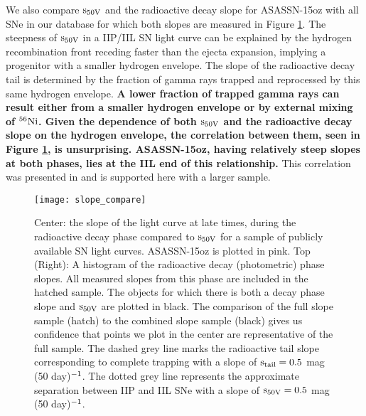 \documentclass[a4paper,fleqn,usenatbib]{mnras}
\begin{document}
We also compare $\rm{s_{50V}}$ and the radioactive decay slope  for ASASSN-15oz with all SNe in our database for which both slopes are measured in Figure \ref{fig:SlopeComp}.
The steepness of $\rm{s_{50V}}$ in a IIP/IIL SN light curve can be explained by the hydrogen recombination front receding faster than the ejecta expansion, implying a progenitor with a smaller hydrogen envelope.
The slope of the radioactive decay tail is determined by the fraction of gamma rays trapped and reprocessed by this same hydrogen envelope.
\textbf{A lower fraction of trapped gamma rays can result either from a smaller hydrogen envelope or by external mixing of $\rm{^{56}Ni}$.
Given the dependence of both  $\rm{s_{50V}}$  and the radioactive decay slope on the hydrogen envelope, the correlation between them, seen in Figure \ref{fig:SlopeComp}, is unsurprising. 
ASASSN-15oz, having relatively steep slopes at both phases, lies at the IIL end of this relationship.}
This correlation was presented in \citet{2014anderson} and is supported here with a larger sample.
\begin{figure}
\begin{center}
\texttt{[image: slope\_compare]} %
\caption{Center: the slope of the light curve at late times, during the radioactive decay phase compared to $\rm{s_{50V}}$ for a sample of publicly available SN light curves.
ASASSN-15oz is plotted in pink.
Top (Right): A histogram of the radioactive decay (photometric) phase slopes. All measured slopes from this phase are included in the hatched sample.
The objects for which there is both a decay phase slope and $\rm{s_{50V}}$  are plotted in black. The comparison of the full slope sample (hatch) to the combined slope sample (black) gives us confidence that points we plot in the center are representative of the full sample. 
The dashed grey line marks the radioactive tail slope corresponding to complete trapping with a slope of $\rm{s_{tail} = 0.5}$ mag (50 day)$\rm{^{-1}}$.
The dotted grey line represents the approximate separation between IIP and IIL SNe with a slope of $\rm{s_{50V}=0.5}$ mag (50 day)$\rm{^{-1}}$. 
 }
\label{fig:SlopeComp}
\end{center}
\end{figure}
\end{document}
